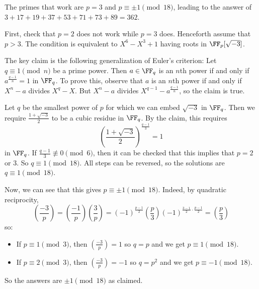 The primes that work are $p=3$ and $p\equiv\pm1\pmod{18}$, leading to the answer of $3+17+19+37+53+71+73+89=362$.
	
	First, check that $p=2$ does not work while $p=3$ does. Henceforth assume that $p>3$. The condition is equivalent to $X^6-X^3+1$ having roots in $\FF_p[\sqrt{-3}]$.
	
	The key claim is the following generalization of Euler's criterion: Let $q\equiv1\pmod n$ be a prime power. Then $a\in\FF_q$ is an $n$th power if and only if $a^{\frac{q-1}{n}}=1$ in $\FF_q$. To prove this, observe that $a$ is an $n$th power if and only if $X^n-a$ divides $X^q-X$. But $X^n-a$ divides $X^{q-1}-a^{\frac{q-1}{n}}$, so the claim is true.
	
	Let $q$ be the smallest power of $p$ for which we can embed $\sqrt{-3}$ in $\FF_q$. Then we require $\frac{1+\sqrt{-3}}{2}$ to be a cubic residue in $\FF_q$. By the claim, this requires
	\[
		\left(\frac{1+\sqrt{-3}}{2}\right)^{\frac{q-1}{3}}=1
	\]
	in $\FF_q$. If $\frac{q-1}{3}\not\equiv0\pmod6$, then it can be checked that this implies that $p=2$ or $3$. So $q\equiv1\pmod{18}$. All steps can be reversed, so the solutions are $q\equiv1\pmod{18}$.
	
	Now, we can see that this gives $p\equiv\pm1\pmod{18}$. Indeed, by quadratic reciprocity,
	\[
		\left(\frac{-3}{p}\right)=\left(\frac{-1}{p}\right)\left(\frac{3}{p}\right)=(-1)^{\frac{p-1}{2}}\left(\frac{p}{3}\right)(-1)^{\frac{3-1}{2}\cdot\frac{p-1}{2}}=\left(\frac{p}{3}\right)
	\]
	so:
	\begin{itemize}
		\item If $p\equiv1\pmod3$, then $\left(\frac{-3}{p}\right)=1$ so $q=p$ and we get $p\equiv1\pmod{18}$.
		\item If $p\equiv2\pmod3$, then $\left(\frac{-3}{p}\right)=-1$ so $q=p^2$ and we get $p\equiv-1\pmod{18}$.
	\end{itemize}
	So the answers are $\pm1\pmod{18}$ as claimed.
	